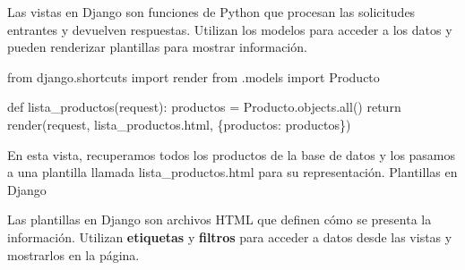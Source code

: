 \documentclass[
  a4paper,
  DIV=11,
  numbers=noendperiod,
  onepage,
  openany]{scrreprt}
\newenvironment{Shaded}{\begin{snugshade}}{\end{snugshade}}
\newcommand{\BuiltInTok}[1]{\textcolor[rgb]{0.00,0.23,0.31}{#1}}
\newcommand{\ControlFlowTok}[1]{\textcolor[rgb]{0.00,0.23,0.31}{#1}}
\newcommand{\DataTypeTok}[1]{\textcolor[rgb]{0.68,0.00,0.00}{#1}}
\newcommand{\ImportTok}[1]{\textcolor[rgb]{0.00,0.46,0.62}{#1}}
\newcommand{\KeywordTok}[1]{\textcolor[rgb]{0.00,0.23,0.31}{#1}}
\newcommand{\NormalTok}[1]{\textcolor[rgb]{0.00,0.23,0.31}{#1}}
\newcommand{\OperatorTok}[1]{\textcolor[rgb]{0.37,0.37,0.37}{#1}}
\newcommand{\StringTok}[1]{\textcolor[rgb]{0.13,0.47,0.30}{#1}}
\begin{document}
Las vistas en Django son funciones de Python que procesan las
solicitudes entrantes y devuelven respuestas. Utilizan los modelos para
acceder a los datos y pueden renderizar plantillas para mostrar
información.

\begin{Shaded}
\begin{Highlighting}[]
\ImportTok{from}\NormalTok{ django.shortcuts }\ImportTok{import}\NormalTok{ render}
\ImportTok{from}\NormalTok{ .models }\ImportTok{import}\NormalTok{ Producto}

\KeywordTok{def}\NormalTok{ lista\_productos(request):}
\NormalTok{    productos }\OperatorTok{=}\NormalTok{ Producto.objects.}\BuiltInTok{all}\NormalTok{()}
    \ControlFlowTok{return}\NormalTok{ render(request, }\StringTok{\textquotesingle{}lista\_productos.html\textquotesingle{}}\NormalTok{, \{}\StringTok{\textquotesingle{}productos\textquotesingle{}}\NormalTok{: productos\})}
\end{Highlighting}
\end{Shaded}

En esta vista, recuperamos todos los productos de la base de datos y los
pasamos a una plantilla llamada lista\_productos.html para su
representación. Plantillas en Django

Las plantillas en Django son archivos HTML que definen cómo se presenta
la información. Utilizan \textbf{etiquetas} y \textbf{filtros} para
acceder a datos desde las vistas y mostrarlos en la página.

\begin{Shaded}
\end{Shaded}
\end{document}
